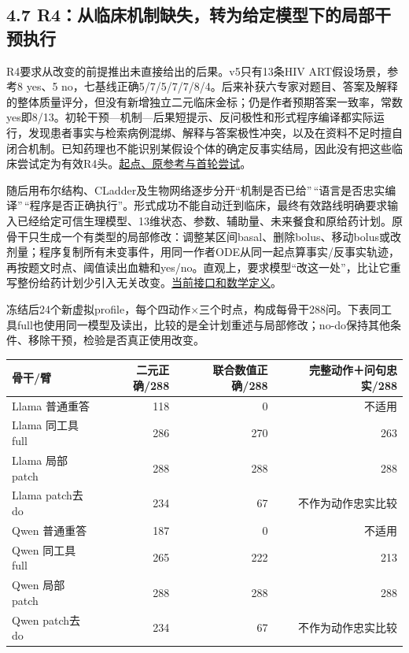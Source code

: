 \documentclass[
  11pt,
  a4paper,
]{article}
\newcounter{none} %
\begin{document}
\subsection{4.7
R4：从临床机制缺失，转为给定模型下的局部干预执行}\label{r4ux4eceux4e34ux5e8aux673aux5236ux7f3aux5931ux8f6cux4e3aux7ed9ux5b9aux6a21ux578bux4e0bux7684ux5c40ux90e8ux5e72ux9884ux6267ux884c}

R4要求从改变的前提推出未直接给出的后果。v5只有13条HIV ART假设场景，参考8
yes、5
no，七基线正确5/7/5/7/7/8/4。后来补获六专家对题目、答案及解释的整体质量评分，但没有新增独立二元临床金标；仍是作者预期答案一致率，常数yes即8/13。初轮干预---机制---后果短提示、反问极性和形式程序编译都实际运行，发现患者事实与检索病例混绑、解释与答案极性冲突，以及在资料不足时擅自闭合机制。已知药理也不能识别某假设个体的确定反事实结局，因此没有把这些临床尝试定为有效R4头。\href{https://github.com/xiotakut/cf_mrg/blob/main/papers/2026-10-02_cf_moa/author_dossier/records/research/r4_consequence_head.md\#L1}{起点、原参考与首轮尝试}。

随后用布尔结构、CLadder及生物网络逐步分开``机制是否已给''\,``语言是否忠实编译''\,``程序是否正确执行''。形式成功不能自动迁到临床，最终有效路线明确要求输入已经给定可信生理模型、13维状态、参数、辅助量、未来餐食和原给药计划。原骨干只生成一个有类型的局部修改：调整某区间basal、删除bolus、移动bolus或改剂量；程序复制所有未变事件，用同一作者ODE从同一起点算事实/反事实轨迹，再按题文时点、阈值读出血糖和yes/no。直观上，要求模型``改这一处''，比让它重写整份给药计划少引入无关改变。\href{https://github.com/xiotakut/cf_mrg/blob/main/papers/2026-10-02_cf_moa/author_dossier/records/research/r4_consequence_head.md\#L15}{当前接口和数学定义}。

冻结后24个新虚拟profile，每个四动作×三个时点，构成每骨干288问。下表同工具full也使用同一模型及读出，比较的是全计划重述与局部修改；no-do保持其他条件、移除干预，检验是否真正使用改变。

{\def\LTcaptype{none} %
\begin{longtable}[]{@{}lrrr@{}}
\toprule\noalign{}
骨干/臂 & 二元正确/288 & 联合数值正确/288 & 完整动作＋问句忠实/288 \\
\midrule\noalign{}
\endhead
\bottomrule\noalign{}
\endlastfoot
Llama 普通重答 & 118 & 0 & 不适用 \\
Llama 同工具full & 286 & 270 & 263 \\
Llama 局部patch & 288 & 288 & 288 \\
Llama patch去do & 234 & 67 & 不作为动作忠实比较 \\
Qwen 普通重答 & 187 & 0 & 不适用 \\
Qwen 同工具full & 265 & 222 & 213 \\
Qwen 局部patch & 288 & 288 & 288 \\
Qwen patch去do & 234 & 67 & 不作为动作忠实比较 \\
\end{longtable}
}
\end{document}
